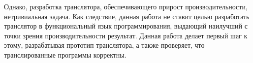 Однако, разработка транслятора, обеспечивающего прирост производительности, нетривиальная задача.
Как следствие, данная работа не ставит целью разработать транслятор в функциональный язык программирования, выдающий наилучший с точки зрения производительности результат.
Данная работа делает первый шаг к этому, разрабатывая прототип транслятора, а также проверяет, что транслированные программы корректны.



